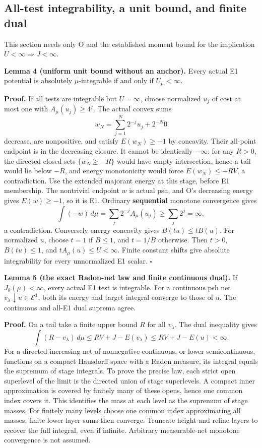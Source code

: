 \documentclass[
  11pt,
]{article}
\begin{document}
\subsection{All-test integrability, a unit bound, and finite
dual}\label{all-test-integrability-a-unit-bound-and-finite-dual}

This section needs only O and the established moment bound for the
implication \(U<\infty\Rightarrow J<\infty\).

\textbf{Lemma 4 (uniform unit bound without an anchor).} Every actual E1
potential is absolutely \(\mu\)-integrable if and only if
\(U_\mu<\infty\).

\textbf{Proof.} If all tests are integrable but \(U=\infty\), choose
normalized \(u_j\) of cost at most one with \(A_\mu(u_j)\geq4^j\). The
actual convex sums \[
 w_N=\sum_{j=1}^N2^{-j}u_j+2^{-N}0
\] decrease, are nonpositive, and satisfy \(E(w_N)\geq-1\) by concavity.
Their all-point endpoint is in the decreasing closure. It cannot be
identically \(-\infty\): for any \(R>0\), the directed closed sets
\(\{w_N\geq-R\}\) would have empty intersection, hence a tail would lie
below \(-R\), and energy monotonicity would force \(E(w_N)\leq-RV\), a
contradiction. Use the extended majorant energy at this stage, before E1
membership. The nontrivial endpoint \(w\) is actual psh, and O's
decreasing energy gives \(E(w)\geq-1\), so it is E1. Ordinary
\textbf{sequential} monotone convergence gives \[
 \int(-w)\,d\mu=\sum_j2^{-j}A_\mu(u_j)\geq\sum_j2^j=\infty,
\] a contradiction. Conversely energy concavity gives
\(B(tu)\leq tB(u)\). For normalized \(u\), choose \(t=1\) if \(B\leq1\),
and \(t=1/B\) otherwise. Then \(t>0\), \(B(tu)\leq1\), and
\(tA_\mu(u)\leq U<\infty\). Finite constant shifts give absolute
integrability for every unnormalized E1 scalar. \(\square\)

\textbf{Lemma 5 (the exact Radon-net law and finite continuous dual).}
If \(J_\theta(\mu)<\infty\), every actual E1 test is integrable. For a
continuous psh net \(v_\lambda\downarrow u\in\mathcal E^1\), both its
energy and target integral converge to those of \(u\). The continuous
and all-E1 dual suprema agree.

\textbf{Proof.} On a tail take a finite upper bound \(R\) for all
\(v_\lambda\). The dual inequality gives \[
 \int(R-v_\lambda)\,d\mu
   \leq RV+J-E(v_\lambda)\leq RV+J-E(u)<\infty.
\] For a directed increasing net of nonnegative continuous, or lower
semicontinuous, functions on a compact Hausdorff space with a Radon
measure, its integral equals the supremum of stage integrals. To prove
the precise law, each strict open superlevel of the limit is the
directed union of stage superlevels. A compact inner approximation is
covered by finitely many of these opens, hence one common index covers
it. This identifies the mass at each level as the supremum of stage
masses. For finitely many levels choose one common index approximating
all masses; finite lower layer sums then converge. Truncate height and
refine layers to recover the full integral, even if infinite. Arbitrary
measurable-net monotone convergence is not assumed.
\end{document}
